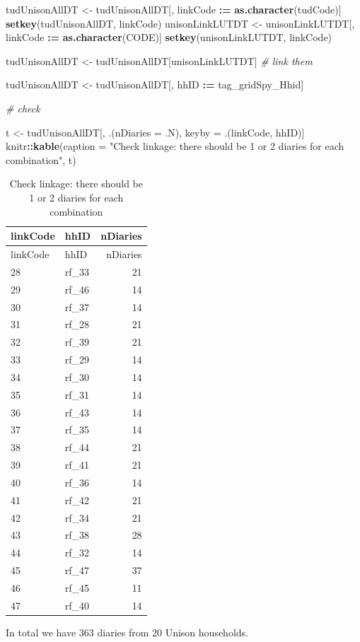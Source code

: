 \documentclass[]{article}
\newenvironment{Shaded}{\begin{snugshade}}{\end{snugshade}}
\newcommand{\KeywordTok}[1]{\textcolor[rgb]{0.13,0.29,0.53}{\textbf{#1}}}
\newcommand{\DataTypeTok}[1]{\textcolor[rgb]{0.13,0.29,0.53}{#1}}
\newcommand{\StringTok}[1]{\textcolor[rgb]{0.31,0.60,0.02}{#1}}
\newcommand{\CommentTok}[1]{\textcolor[rgb]{0.56,0.35,0.01}{\textit{#1}}}
\newcommand{\OperatorTok}[1]{\textcolor[rgb]{0.81,0.36,0.00}{\textbf{#1}}}
\newcommand{\ErrorTok}[1]{\textcolor[rgb]{0.64,0.00,0.00}{\textbf{#1}}}
\newcommand{\NormalTok}[1]{#1}
\begin{document}
\begin{Shaded}
\begin{Highlighting}[]
\NormalTok{tudUnisonAllDT <-}\StringTok{ }\NormalTok{tudUnisonAllDT[, linkCode }\OperatorTok{:}\ErrorTok{=}\StringTok{ }\KeywordTok{as.character}\NormalTok{(tudCode)]}
\KeywordTok{setkey}\NormalTok{(tudUnisonAllDT, linkCode)}
\NormalTok{unisonLinkLUTDT <-}\StringTok{ }\NormalTok{unisonLinkLUTDT[, linkCode }\OperatorTok{:}\ErrorTok{=}\StringTok{ }\KeywordTok{as.character}\NormalTok{(CODE)]}
\KeywordTok{setkey}\NormalTok{(unisonLinkLUTDT, linkCode)}

\NormalTok{tudUnisonAllDT <-}\StringTok{ }\NormalTok{tudUnisonAllDT[unisonLinkLUTDT] }\CommentTok{# link them}

\NormalTok{tudUnisonAllDT <-}\StringTok{ }\NormalTok{tudUnisonAllDT[, hhID }\OperatorTok{:}\ErrorTok{=}\StringTok{ }\NormalTok{tag_gridSpy_Hhid]}

\CommentTok{# check}

\NormalTok{t <-}\StringTok{ }\NormalTok{tudUnisonAllDT[, .(}\DataTypeTok{nDiaries =}\NormalTok{ .N), keyby =}\StringTok{ }\NormalTok{.(linkCode, hhID)]}
\NormalTok{knitr}\OperatorTok{::}\KeywordTok{kable}\NormalTok{(}\DataTypeTok{caption =} \StringTok{"Check linkage: there should be 1 or 2 diaries for each combination"}\NormalTok{, t)}
\end{Highlighting}
\end{Shaded}

\begin{longtable}[]{@{}llr@{}}
\caption{Check linkage: there should be 1 or 2 diaries for each
combination}\tabularnewline
\toprule
linkCode & hhID & nDiaries\tabularnewline
\midrule
\endfirsthead
\toprule
linkCode & hhID & nDiaries\tabularnewline
\midrule
\endhead
28 & rf\_33 & 21\tabularnewline
29 & rf\_46 & 14\tabularnewline
30 & rf\_37 & 14\tabularnewline
31 & rf\_28 & 21\tabularnewline
32 & rf\_39 & 21\tabularnewline
33 & rf\_29 & 14\tabularnewline
34 & rf\_30 & 14\tabularnewline
35 & rf\_31 & 14\tabularnewline
36 & rf\_43 & 14\tabularnewline
37 & rf\_35 & 14\tabularnewline
38 & rf\_44 & 21\tabularnewline
39 & rf\_41 & 21\tabularnewline
40 & rf\_36 & 14\tabularnewline
41 & rf\_42 & 21\tabularnewline
42 & rf\_34 & 21\tabularnewline
43 & rf\_38 & 28\tabularnewline
44 & rf\_32 & 14\tabularnewline
45 & rf\_47 & 37\tabularnewline
46 & rf\_45 & 11\tabularnewline
47 & rf\_40 & 14\tabularnewline
\bottomrule
\end{longtable}

In total we have 363 diaries from 20 Unison households.
\end{document}
